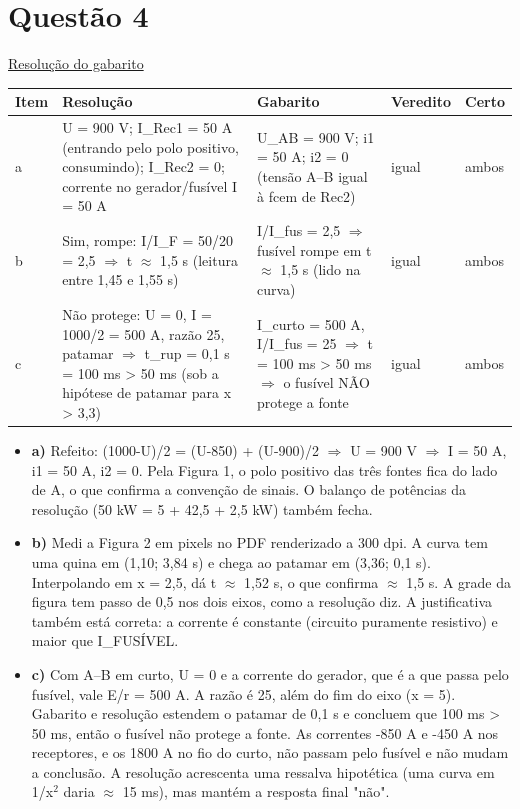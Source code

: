 \documentclass{article}%
\begin{document}
\section*{Questão 4}%
\href{https://poliedroresolve.sistemapoliedro.com.br/vestibulares/ime/2027/ime-2-fase-dia-2-27-10-2026-2-fase-dia-2/dissertativa-4-fisica-2-fase-dia-2-ime-2027}{Resolução do gabarito}\par\smallskip%
\begin{longtable}{@{}p{} p{} p{} p{} p{}@{}}\toprule Item & Resolução & Gabarito & Veredito & Certo \\ \midrule
a & U = 900 V; I\_Rec1 = 50 A (entrando pelo polo positivo, consumindo); I\_Rec2 = 0; corrente no gerador/fusível I = 50 A & U\_AB = 900 V; i1 = 50 A; i2 = 0 (tensão A--B igual à fcem de Rec2) & igual & ambos \\
b & Sim, rompe: I/I\_F = 50/20 = 2,5 $\Rightarrow$ t $\approx$ 1,5 s (leitura entre 1,45 e 1,55 s) & I/I\_fus = 2,5 $\Rightarrow$ fusível rompe em t $\approx$ 1,5 s (lido na curva) & igual & ambos \\
c & Não protege: U = 0, I = 1000/2 = 500 A, razão 25, patamar $\Rightarrow$ t\_rup = 0,1 s = 100 ms > 50 ms (sob a hipótese de patamar para x > 3,3) & I\_curto = 500 A, I/I\_fus = 25 $\Rightarrow$ t = 100 ms > 50 ms $\Rightarrow$ o fusível NÃO protege a fonte & igual & ambos \\
\bottomrule\end{longtable}%
\begin{itemize}%
\item%
\textbf{a)} Refeito: (1000-U)/2 = (U-850) + (U-900)/2 $\Rightarrow$ U = 900 V $\Rightarrow$ I = 50 A, i1 = 50 A, i2 = 0. Pela Figura 1, o polo positivo das três fontes fica do lado de A, o que confirma a convenção de sinais. O balanço de potências da resolução (50 kW = 5 + 42,5 + 2,5 kW) também fecha.%
\item%
\textbf{b)} Medi a Figura 2 em pixels no PDF renderizado a 300 dpi. A curva tem uma quina em (1,10; 3,84 s) e chega ao patamar em (3,36; 0,1 s). Interpolando em x = 2,5, dá t $\approx$ 1,52 s, o que confirma $\approx$ 1,5 s. A grade da figura tem passo de 0,5 nos dois eixos, como a resolução diz. A justificativa também está correta: a corrente é constante (circuito puramente resistivo) e maior que I\_FUSÍVEL.%
\item%
\textbf{c)} Com A--B em curto, U = 0 e a corrente do gerador, que é a que passa pelo fusível, vale E/r = 500 A. A razão é 25, além do fim do eixo (x = 5). Gabarito e resolução estendem o patamar de 0,1 s e concluem que 100 ms > 50 ms, então o fusível não protege a fonte. As correntes -850 A e -450 A nos receptores, e os 1800 A no fio do curto, não passam pelo fusível e não mudam a conclusão. A resolução acrescenta uma ressalva hipotética (uma curva em 1/x$^2$ daria $\approx$ 15 ms), mas mantém a resposta final "não".%
\end{itemize}%
\end{document}
